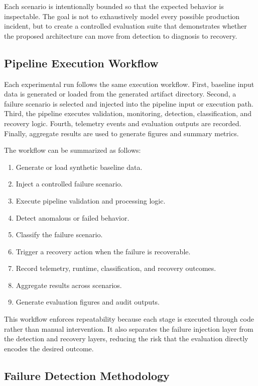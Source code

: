 Each scenario is intentionally bounded so that the expected behavior is inspectable. The goal is not to exhaustively model every possible production incident, but to create a controlled evaluation suite that demonstrates whether the proposed architecture can move from detection to diagnosis to recovery.

\subsection{Pipeline Execution Workflow}

Each experimental run follows the same execution workflow. First, baseline input data is generated or loaded from the generated artifact directory. Second, a failure scenario is selected and injected into the pipeline input or execution path. Third, the pipeline executes validation, monitoring, detection, classification, and recovery logic. Fourth, telemetry events and evaluation outputs are recorded. Finally, aggregate results are used to generate figures and summary metrics.

The workflow can be summarized as follows:

\begin{enumerate}
    \item Generate or load synthetic baseline data.
    \item Inject a controlled failure scenario.
    \item Execute pipeline validation and processing logic.
    \item Detect anomalous or failed behavior.
    \item Classify the failure scenario.
    \item Trigger a recovery action when the failure is recoverable.
    \item Record telemetry, runtime, classification, and recovery outcomes.
    \item Aggregate results across scenarios.
    \item Generate evaluation figures and audit outputs.
\end{enumerate}

This workflow enforces repeatability because each stage is executed through code rather than manual intervention. It also separates the failure injection layer from the detection and recovery layers, reducing the risk that the evaluation directly encodes the desired outcome.

\subsection{Failure Detection Methodology}

